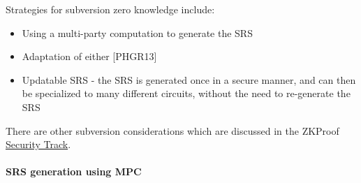 Strategies for subversion zero knowledge include:
\begin{itemize}[label={- }]
    \item Using a multi-party computation to generate the SRS
    \item Adaptation of either \cite{2016:Eurocrypt:On-the-Size-of-Pairing-Based-Non-interactive-Arguments} %
		[PHGR13]
    \item Updatable SRS - the SRS is generated once in a secure manner, and can then be specialized to many different circuits, without the need to re-generate the SRS
\end{itemize}

There are other subversion considerations which are discussed in the ZKProof \hyperref[chap:security]{Security Track}.



\paragraph{SRS generation using MPC}

